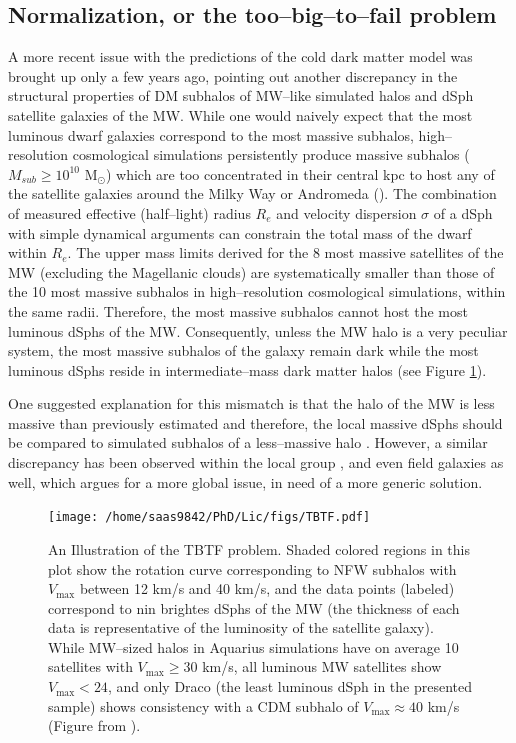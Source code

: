 \documentclass[a4wide,12pt]{book}
\newcommand{\msun }{$\mathrm{M}_{\odot}$}
\begin{document}
{\subsection{Normalization, or the too--big--to--fail problem}
\label{subsec:too-big-to-fail}
A more recent issue with the predictions of the cold dark matter model was brought up only a few years ago, pointing out another discrepancy in the structural properties of DM subhalos of MW--like simulated halos and dSph satellite galaxies of the MW. While one would naively expect that the most luminous dwarf galaxies correspond to the most massive subhalos, high--resolution cosmological simulations persistently produce massive subhalos ($M_{sub} \geq 10^{10} $ \msun ) which are too concentrated in their central kpc to host any of the satellite galaxies around the Milky Way or Andromeda (\cite{Boylan-Kolchin+2011, Boylan-Kolchin+2012}). The combination of measured effective (half--light) radius $R_e$ and velocity dispersion $\sigma$ of a dSph with simple dynamical arguments can constrain the total mass of the dwarf within $R_e$. The upper mass limits derived for the 8 most massive satellites of the MW (excluding the Magellanic clouds) are systematically smaller than those of the 10 most massive subhalos in high--resolution cosmological simulations, within the same radii. Therefore, the most massive subhalos cannot host the most luminous dSphs of the MW. Consequently, unless the MW halo is a very peculiar system, the most massive subhalos of the galaxy remain dark while the most luminous dSphs reside in intermediate--mass dark matter halos (see Figure \ref{fig:TBTF}). 

One suggested explanation for this mismatch is that the halo of the MW is less massive than previously estimated and therefore, the local massive dSphs should be compared to simulated subhalos of a less--massive halo \citep[][]{Boylan-Kolchin+2012, Vera-Ciro+2013}. However, a similar discrepancy has been observed within the local group \citep[][]{Kirby+2014, Garrison-Kimmel+2014, Tollerud+2014}, and even field galaxies \citep[][]{Papastergis+2015} as well, which argues for a more global issue, in need of a more generic solution. 

\begin{figure}
\label{fig:TBTF}
\centering
\texttt{[image: /home/saas9842/PhD/Lic/figs/TBTF.pdf]}
\caption{An Illustration of the TBTF problem. Shaded colored regions in this plot show the rotation curve corresponding to NFW subhalos with $V_\mathrm{max}$ between 12 km/s and 40 km/s, and the data points (labeled) correspond to nin brightes dSphs of the MW (the thickness of each data is representative of the luminosity of the satellite galaxy). While MW--sized halos in Aquarius simulations have on average 10 satellites with $V_\mathrm{max} \geq 30$ km/s, all luminous MW satellites show $V_\mathrm{max} < 24$, and only Draco (the least luminous dSph in the presented sample) shows consistency with a CDM subhalo of $V_\mathrm{max} \approx 40$ km/s (Figure from \citealt[][]{Boylan-Kolchin+2012}).}
\end{figure}


}
\end{document}
